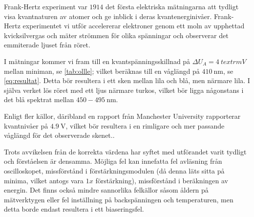 Frank-Hertz experiment var $1914$ det första elektriska mätningarna att tydligt visa kvantnaturen av atomer och ge inblick i deras kvantenerginivåer. Frank-Hertz experimentet vi utför accelererar elektroner genom ett moln av upphettad kvicksilvergas och mäter strömmen för olika spänningar och observerar det emmiterade ljuset från röret.

I mätningar kommer vi fram till en kvantspänningsskillnad på $\Delta U_A = 4~textrm{V}$ mellan miniman, se \cref{tab:ollle}; vilket beräknas till en våglängd på $410~\textrm{nm}$, se \cref{eq:resultat}. Detta bör resultera i ett sken mellan lila och blå, men närmare lila. I själva verket lös röret med ett ljus närmare turkos, vilket bör ligga någonstans i det blå spektrat mellan $450 - 495~\textrm{nm}$.

Enligt fler källor, däribland en rapport från Manchester University\cite{bmfrankhertz} rapporterar kvantnivåer på $4.9~\textrm{V}$, vilket bör resultera i en rimligare och mer passande våglängd för det observerade skenet..

Trots avvikelsen från de korrekta värdena har syftet med utförandet varit tydligt och förståelsen är densamma. Möjliga fel kan innefatta fel avläsning från oscilloskopet, missförstånd i förstärkningsmodulen (då denna läts sitta på minima, vilket antogs vara $1x$ förstärkning), missförstånd i beräkningen av energin. Det finns också mindre sannorlika felkällor såsom åldern på mätverktygen eller fel inställning på backspänningen och temperaturen, men detta borde endast resultera i ett biaseringsfel.